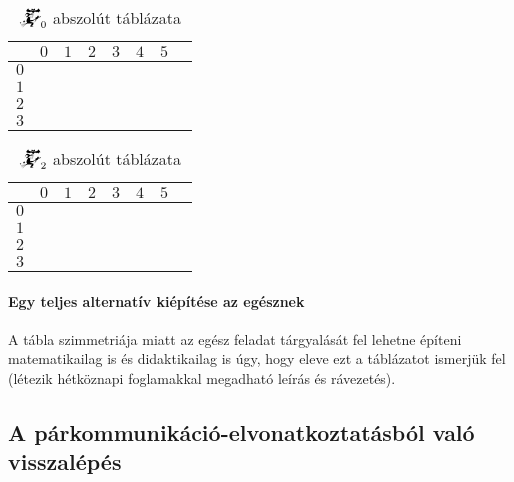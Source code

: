 \documentclass{article}
\newcommand{\blk}{\cellcolor{darkgray}}
\newcommand{\red}{\cellcolor{red!33}}
\newcommand{\grn}{\cellcolor{green!33}}
\newcommand{\nothing}{\text{\raisebox{0.4em}{\rotatebox{180}{$\curvearrowleft$}}}}%
\newcommand{\just}[1]{\boxed{#1}}%
\newcommand{\incl}{\mathbf{incl}}
\newcommand{\excl}{\mathbf{excl}}
\newcommand{\currymainfunabs}[1]{\overbat{\mathwitch*_{#1}}}
\begin{document}
	\begin{table}[H]
		\caption*{$\currymainfunabs0$ abszolút táblázata}
		\centering
		\begin{tabular}{c||c|c|c|c|c|c|c|}
				&	$0$		&	$1$		&	$2$		&	$3$		&	$4$		&	$5$		\\\hline\hline
			$0$	&	\nothing	&	\nothing	&	\nothing	&	\nothing	&	\nothing	&	\grn\just\incl	\\\hline
			$1$	&	\red\just\excl	&	\nothing	&	\nothing	&	\nothing	&	\grn\just\incl	&	\blk		\\\hline
			$2$	&	\blk		&	\red\just\excl	&	\nothing	&	\grn\just\incl	&	\blk		&	\blk		\\\hline
			$3$	&	\blk		&	\blk		&	\blk		&	\blk		&	\blk		&	\blk		\\\hline
		\end{tabular}
	\end{table}

	\begin{table}[H]
		\caption*{$\currymainfunabs2$ abszolút táblázata}
		\centering
		\begin{tabular}{c||c|c|c|c|c|c|c|}
				&	$0$		&	$1$		&	$2$		&	$3$		&	$4$		&	$5$		\\\hline\hline
		$0$	&	\red\just\excl	&	\nothing	&	\nothing	&	\nothing	&	\nothing	&	\grn\just\incl	\\\hline
		$1$	&	\blk		&	\red\just\excl	&	\nothing	&	\nothing	&	\grn\just\incl	&	\blk		\\\hline
		$2$	&	\blk		&	\blk		&	\red\just\excl	&	\grn\just\incl	&	\blk		&	\blk		\\\hline
		$3$	&	\blk		&	\blk		&	\blk		&	\blk		&	\blk		&	\blk		\\\hline
		\end{tabular}
	\end{table}

	\paragraph{Egy teljes alternatív kiépítése az egésznek}
	A tábla szimmetriája miatt az egész feladat tárgyalását fel lehetne építeni matematikailag is és didaktikailag is úgy, hogy eleve  ezt a táblázatot ismerjük fel (létezik hétköznapi foglamakkal megadható leírás és rávezetés).

	\subsection{A párkommunikáció-elvonatkoztatásból való visszalépés}
\end{document}
